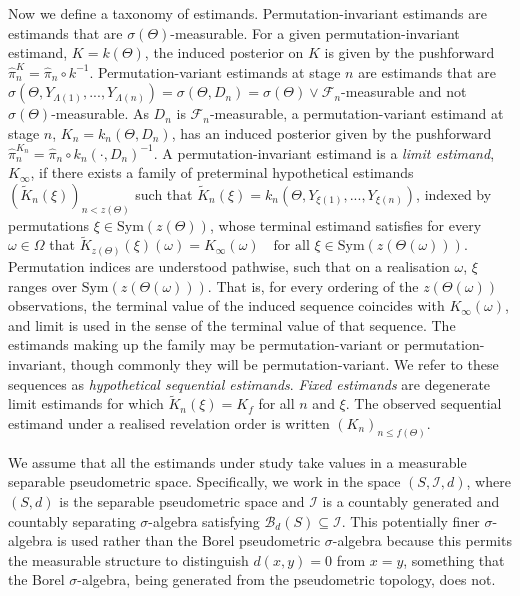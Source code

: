 \documentclass{article}
\newcommand{\F}{\mathcal{F}}
\newcommand{\1}{\mathbbm{1}}
\begin{document}
Now we define a taxonomy of estimands. Permutation-invariant estimands are estimands that are $\sigma(\Theta)$-measurable. For a given permutation-invariant estimand, $K=k(\Theta)$, the induced posterior on $K$ is given by the pushforward $\hat{\pi}_n^K=\hat{\pi}_n\circ k^{-1}$. Permutation-variant estimands at stage $n$ are estimands that are $\sigma(\Theta,Y_{\Lambda(1)},...,Y_{\Lambda(n)})=\sigma(\Theta,D_n)=\sigma(\Theta)\vee \F_n$-measurable and not $\sigma(\Theta)$-measurable. As $D_n$ is $\mathcal{F}_n$-measurable, a permutation-variant estimand at stage $n$, $K_n=k_n(\Theta,D_n)$, has an induced posterior given by the pushforward $\hat{\pi}_n^{K_n}=\hat{\pi}_n\circ k_n(\cdot, D_n)^{-1}$. A permutation-invariant estimand is a \textit{limit estimand}, $K_\infty$, if there exists a family of preterminal hypothetical estimands $(\widetilde K_n(\xi))_{n < z(\Theta)}$ such that $\widetilde K_n(\xi)=k_n(\Theta,Y_{\xi(1)},...,Y_{\xi(n)})$, indexed by permutations $\xi \in \mathrm{Sym}(z(\Theta))$, whose terminal estimand satisfies for every $\omega \in \Omega$ that $\widetilde K_{z(\Theta)}(\xi)(\omega) = K_\infty(\omega)
\quad \text{for all } \xi \in \mathrm{Sym}(z(\Theta(\omega)))$. Permutation indices are understood pathwise, such that on a realisation $\omega$, $\xi$ ranges over $\mathrm{Sym}(z(\Theta(\omega)))$. That is, for every ordering of the $z(\Theta(\omega))$ observations, the terminal value of the induced sequence coincides with $K_\infty(\omega)$, and limit is used in the sense of the terminal value of that sequence. The estimands making up the family may be permutation-variant or permutation-invariant, though commonly they will be permutation-variant. We refer to these sequences as \textit{hypothetical sequential estimands}.
\textit{Fixed estimands} are degenerate limit estimands for which $\widetilde K_n(\xi)=K_f$ for all $n$ and $\xi$. The observed sequential estimand under a realised revelation order is written $(K_n)_{n \le f(\Theta)}$.

We assume that all the estimands under study take values in a measurable separable pseudometric space. Specifically, we work in the space $(S,\mathcal{I},d)$, where $(S,d)$ is the separable pseudometric space and $\mathcal{I}$ is a countably generated and countably separating $\sigma$-algebra satisfying $\mathcal{B}_d(S)\subseteq\mathcal{I}$. This potentially finer $\sigma$-algebra is used rather than the Borel pseudometric $\sigma$-algebra because this permits the measurable structure to distinguish $d(x,y)=0$ from $x=y$, something that the Borel $\sigma$-algebra, being generated from the pseudometric topology, does not.
\end{document}
